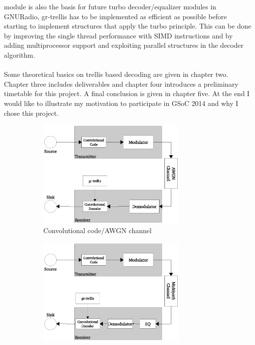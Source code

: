 \documentclass[11pt,		%
	    DIV12,		%
	    a4paper,		%
	    final,		%
	    halfparskip,	%
	    ]{scrartcl}		%
\begin{document}
module is also the basis for future turbo decoder/equalizer modules in GNURadio, gr-trellis has to be implemented as efficient as possible before starting to implement structures that apply the turbo principle. This can be done by improving the single thread performance with SIMD instructions and by adding multiprocessor support and exploiting parallel structures in the decoder algorithm.\\ \\Some theoretical basics on trellis based decoding are given in chapter two. Chapter three includes deliverables and chapter four introduces a preliminary timetable for this project. A final conclusion is given in chapter five. At the end I would like to illustrate my motivation to participate in GSoC 2014 and why I chose this project.  
\begin{figure}[htbp] 
  \centering
  \begin{subfigure}[bt]{0.45\textwidth}
       \includegraphics[width=0.8\textwidth]{figures/dec.eps}
  \caption{Convolutional code/AWGN channel}
    \label{fig:dec}
  \end{subfigure}
  \begin{subfigure}[bt] {0.45\textwidth}
     \includegraphics[width=0.8\textwidth]{figures/deceq.eps}

\end{subfigure}
\end{figure}
\end{document}
